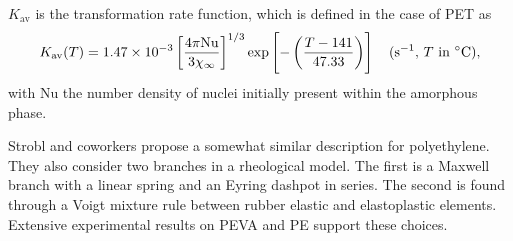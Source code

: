 $K_\text{av}$ is the transformation rate function, which is defined in the case of PET as
\begin{equation}
	K_\text{av}(T) = 1.47\times 10^{-3} \left[\frac{4\pi \mathrm{Nu}}{3\chi_\infty}\right]^{1/3} \exp\left[-\left(\frac{T - 141}{47.33}\right)\right] \quad \text{(\si{\per\second}, $T$ in \si{\celsius})},
\end{equation}
with $\mathrm{Nu}$ the number density of nuclei initially present within the amorphous phase.

Strobl and coworkers \citep{hongModelTreatingTensile2004, hongModelTreatmentTensile2004, naViscousForceDominatedTensileDeformation2006} propose a somewhat similar description for polyethylene.
They also consider two branches in a rheological model.
The first is a Maxwell branch with a linear spring and an Eyring dashpot in series.
The second is found through a Voigt mixture rule between rubber elastic and elastoplastic elements.
Extensive experimental results on PEVA and PE support these choices.

